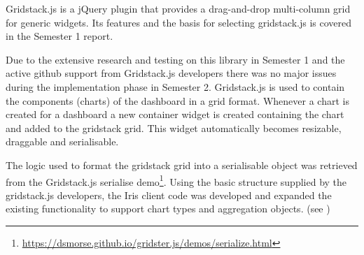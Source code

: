 \documentclass[12pt,a4paper,titlepage]{report}
\begin{document}
Gridstack.js is a jQuery plugin that provides a drag-and-drop multi-column grid for generic widgets. 
Its features and the basis for selecting gridstack.js is covered in the Semester 1 report.  
 
Due to the extensive research and testing on this library in Semester 1 and the active github support from Gridstack.js developers there was no major issues during the implementation phase in Semester 2. Gridstack.js is used to contain the components (charts) of the dashboard in a grid format. Whenever a chart is created for a dashboard a new container widget is created containing the chart and added to the gridstack grid. This widget automatically becomes resizable, draggable and serialisable.

The logic used to format the gridstack grid into a serialisable object was retrieved from the Gridstack.js serialise demo\footnote{\url{https://dsmorse.github.io/gridster.js/demos/serialize.html}}. Using the basic structure supplied by the gridstack.js developers, the Iris client code was developed and expanded the existing functionality to support chart types and aggregation objects. (see )
\end{document}
